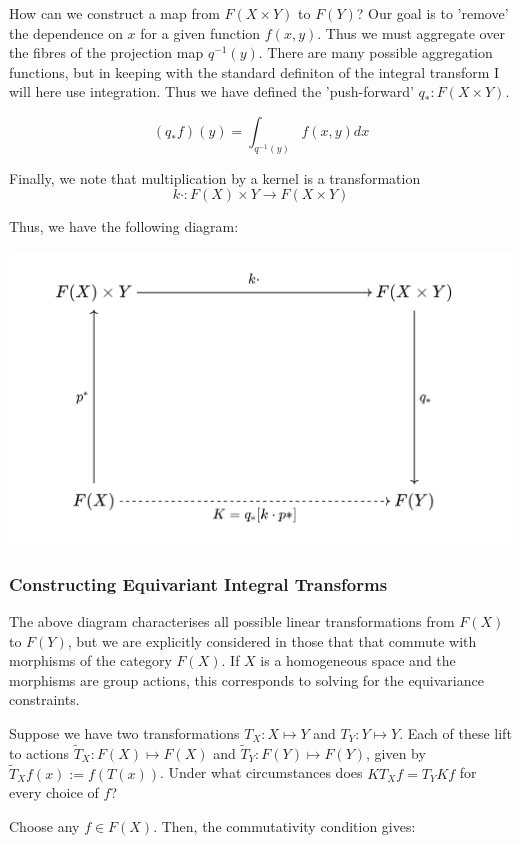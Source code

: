 \documentclass[11pt]{article}
\begin{document}
How can we construct a map from $F(X \times Y)$ to $F(Y)$? Our goal is to 'remove' the dependence on $x$ for a given function $f(x, y)$. Thus we must aggregate over the fibres of the projection map $q^{-1}(y)$. There are many possible aggregation functions, but in keeping with the standard definiton of the integral transform I will here use integration. Thus we have defined the 'push-forward' $q_* : F(X \times Y)$.

$$ (q_* f)(y) = \int_{q^{-1}(y)} f(x, y) dx $$

Finally, we note that multiplication by a kernel is a transformation 
$$k \cdot : F(X) \times Y \rightarrow F(X \times Y)$$ 

Thus, we have the following diagram:

\includegraphics[scale=0.4]{integral_transform_diagram.png}

\subsubsection*{Constructing Equivariant Integral Transforms}

The above diagram characterises all possible linear transformations from $F(X)$ to $F(Y)$, but we are explicitly considered in those that that commute with morphisms of the category $F(X)$. If $X$ is a homogeneous space and the morphisms are group actions, this corresponds to solving for the equivariance constraints.

Suppose we have two transformations $T_X: X \mapsto Y$ and $T_Y: Y \mapsto Y$. Each of these lift to actions $\tilde{T}_X: F(X) \mapsto F(X)$ and $\tilde{T}_Y: F(Y) \mapsto F(Y)$, given by $\tilde{T}_X f(x) := f(T(x))$. Under what circumstances does $K T_X f = T_Y K f$ for every choice of $f$?

Choose any $f \in F(X)$. Then, the commutativity condition gives:
\end{document}
